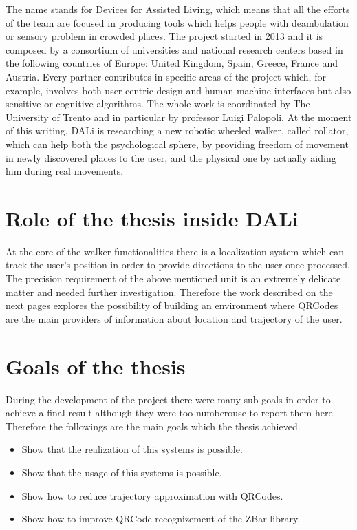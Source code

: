 The name stands for Devices for Assisted Living, which means that all the efforts of the team are focused in producing tools which helps people with deambulation or sensory problem in crowded places.
The project started in 2013 and it is composed by a consortium of universities and national research centers based in the following countries of Europe: United Kingdom, Spain, Greece, France and Austria.
Every partner contributes in specific areas of the project which, for example, involves both user centric design and human machine interfaces but also sensitive or cognitive algorithms.
The whole work is coordinated by The University of Trento and in particular by professor Luigi Palopoli.
At the moment of this writing, DALi is researching a new robotic wheeled walker, called rollator, which can help both the psychological sphere, by providing freedom of movement in newly discovered places to the user, and the physical one by actually aiding him during real movements.


\section{Role of the thesis inside DALi}
At the core of the walker functionalities there is a localization system which can track the user's position in order to provide directions to the user once processed.
The precision requirement of the above mentioned unit is an extremely delicate matter and needed further investigation.
Therefore the work described on the next pages explores the possibility of building an environment where QRCodes are the main providers of information about location and trajectory of the user.

\section{Goals of the thesis}
During the development of the project there were many sub-goals in order to achieve a final result although they were too numberouse to report them here.
Therefore the followings are the main goals which the thesis achieved.
\begin{itemize}
	\item Show that the realization of this systems is possible.
	\item Show that the usage of this systems is possible.
	\item Show how to reduce trajectory approximation with QRCodes.
	\item Show how to improve QRCode recognizement of the ZBar library.
\end{itemize}


